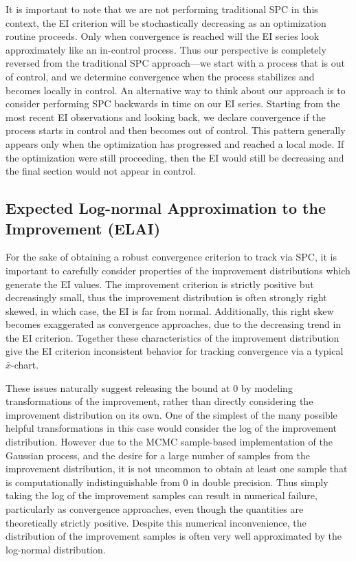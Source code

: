 \documentclass[12pt]{article}
\begin{document}
It is important to note that we are not performing traditional SPC in this context, the EI criterion will be stochastically decreasing as an optimization routine proceeds.  Only when convergence is reached will the EI series look approximately like an in-control process.  Thus our perspective is completely reversed from the traditional SPC approach---we start with a process that is out of control, and we determine convergence when the process stabilizes and becomes locally in control.  An alternative way to think about our approach is to consider performing SPC backwards in time on our EI series.  Starting from the most recent EI observations and looking back, we declare convergence if the process starts in control and then becomes out of control.  This pattern generally appears only when the optimization has progressed and reached a local mode.  If the optimization were still proceeding, then the EI would still be decreasing and the final section would not appear in control.

%
%
\subsection{Expected Log-normal Approximation to the Improvement (ELAI)}
%
%

%
For the sake of obtaining a robust convergence criterion to track via SPC, it is important to carefully consider properties of the improvement distributions which generate the EI values.
%
%
The improvement criterion is strictly positive but decreasingly small, thus the improvement distribution is often strongly right skewed, in which case, the EI is far from normal.
%
Additionally, this right skew becomes exaggerated as convergence approaches, due to the decreasing trend in the EI criterion.
Together these characteristics of the improvement distribution give the EI criterion inconsistent behavior for tracking convergence via a typical $\bar x$-chart. 
 
%
%

These issues naturally suggest releasing the bound at 0 by modeling transformations of the improvement, rather than directly considering the improvement distribution on its own.
%
One of the simplest of the many possible helpful transformations in this case would consider the log of the improvement distribution. 
%
However due to the MCMC sample-based implementation of the Gaussian process, and the desire for a large number of samples from the improvement distribution, it is not uncommon to obtain at least one sample that is computationally indistinguishable from 0 in double precision.
%
Thus simply taking the log of the improvement samples can result in numerical failure, particularly as convergence approaches, even though the quantities are theoretically strictly positive.
%
Despite this numerical inconvenience, the distribution of the improvement samples is often very well approximated by the log-normal distribution. 
\end{document}
